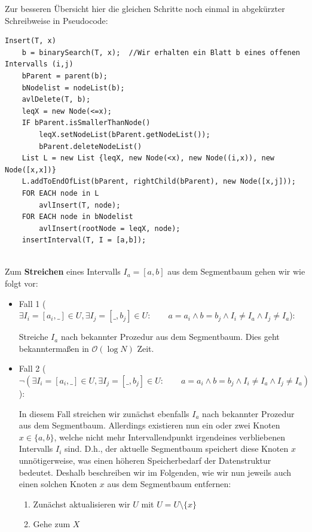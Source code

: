 \documentclass[a4paper]{article}
\begin{document}
\begin{itemize}
\begin{itemize}
\begin{enumerate}
     \end{enumerate}
\end{itemize}

Zur besseren Übersicht hier die gleichen Schritte noch einmal in abgekürzter Schreibweise in
Pseudocode:

\begin{lstlisting}
Insert(T, x)
	b = binarySearch(T, x);  //Wir erhalten ein Blatt b eines offenen Intervalls (i,j)
	bParent = parent(b);
	bNodelist = nodeList(b);
	avlDelete(T, b);
	leqX = new Node(<=x);
	IF bParent.isSmallerThanNode()
		leqX.setNodeList(bParent.getNodeList());
		bParent.deleteNodeList()
	List L = new List {leqX, new Node(<x), new Node((i,x)), new Node([x,x])}
	L.addToEndOfList(bParent, rightChild(bParent), new Node([x,j]));
	FOR EACH node in L
		avlInsert(T, node);
	FOR EACH node in bNodelist
		avlInsert(rootNode = leqX, node);
	insertInterval(T, I = [a,b]);
	
\end{lstlisting}

Zum \textbf{Streichen} eines Intervalls $I_a = [a,b]$ aus dem Segmentbaum gehen wir wie folgt vor:

\begin{itemize}
	\item Fall 1 ($\exists I_i = [a_i, \_] \in U, \exists I_j = [\_, b_j] \in U: \qquad a = a_i \wedge b = b_j \wedge I_i \neq I_a \wedge I_j \neq I_a $):
	
	Streiche $I_a$ nach bekannter Prozedur aus dem Segmentbaum. Dies geht bekanntermaßen in 
	$\mathcal{O}(\log N)$ Zeit. 
	\item Fall 2 ($\neg(\exists I_i = [a_i, \_] \in U, \exists I_j = [\_, b_j] \in U: \qquad a = a_i \wedge b = b_j \wedge I_i \neq I_a \wedge I_j \neq I_a )$):
	
	In diesem Fall streichen wir zunächst ebenfalls $I_a$ nach bekannter Prozedur aus dem Segmentbaum.
	Allerdings existieren nun ein oder zwei Knoten $x \in \{a,b\}$, welche nicht mehr Intervallendpunkt
	irgendeines verbliebenen Intervalls $I_i$ sind. D.h., der aktuelle Segmentbaum speichert diese
	Knoten $x$ unnötigerweise, was einen höheren Speicherbedarf der Datenstruktur bedeutet.
	Deshalb beschreiben wir im Folgenden, wie wir nun jeweils auch einen solchen Knoten $x$ aus dem Segmentbaum
	entfernen:
	
	\begin{enumerate}
		\item Zunächst aktualisieren wir $U$ mit $U = U\setminus \{x\}$
		\item Gehe zum $X$
	\end{enumerate}
\end{itemize}

\end{itemize}
\end{document}
